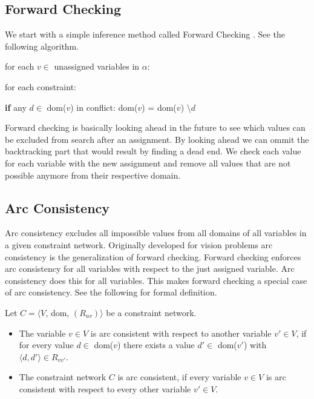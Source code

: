 \subsection{Forward Checking}

We start with a simple inference method called Forward Checking \cite{forward_checking:1980}. See the following algorithm.

\begin{tcolorbox}[title={function ForwardChecking($C, \alpha$)}]
	for each $v \in $ unassigned variables in $\alpha$:

	for each constraint:

	\textbf{if} any $d \in$ dom($v$) in conflict:
	dom($v$) = dom($v$) $\setminus d$
\end{tcolorbox}

Forward checking is basically looking ahead in the future to see which values can be excluded from search after an assignment. By looking ahead we can ommit the backtracking part that would result by finding a dead end. We check each value for each variable with the new assignment and remove all values that are not possible anymore from their respective domain.

\subsection{Arc Consistency}

Arc consistency excludes all impossible values from all domains of all variables in a given constraint network. Originally developed for vision problems \cite{original_arc:1988} arc consistency is the generalization of forward checking. Forward checking enforces arc consistency for all variables with respect to the just assigned variable. Arc consistency does this for all variables. This makes forward checking a special case of arc consistency. See the following for formal definition.

\begin{tcolorbox}[title=Definition: Arc Consistent]
	Let $C = \langle V$, dom, $(R_{uv})\rangle$ be a constraint network.
	\begin{itemize}
		\item The variable $v \in V$ is arc consistent with respect to another variable $v'\in V$, if for every value $d \in$ dom($v$) there exists a value $d' \in$ dom($v'$) with $\langle d, d' \rangle \in R_{vv'}$.
		\item The constraint network $C$ is arc consistent, if every variable $v \in V$ is arc consistent with respect to every other variable $v' \in V$.
	\end{itemize}
\end{tcolorbox}

